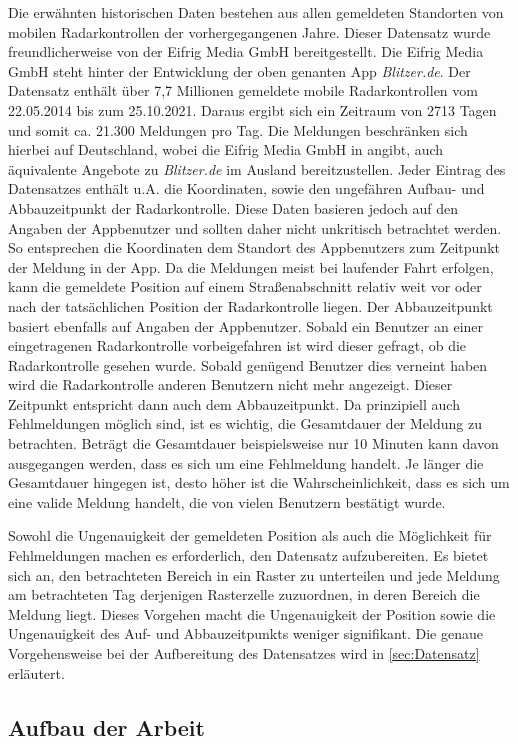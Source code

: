 Die erwähnten historischen Daten bestehen aus allen gemeldeten Standorten von mobilen Radarkontrollen der vorhergegangenen Jahre.
Dieser Datensatz wurde freundlicherweise von der Eifrig Media GmbH bereitgestellt.
Die Eifrig Media GmbH steht hinter der Entwicklung der oben genanten App \emph{Blitzer.de}.
Der Datensatz enthält über 7,7 Millionen gemeldete mobile Radarkontrollen vom 22.05.2014 bis zum 25.10.2021.
Daraus ergibt sich ein Zeitraum von 2713 Tagen und somit ca. 21.300 Meldungen pro Tag.
Die Meldungen beschränken sich hierbei auf Deutschland, wobei die Eifrig Media GmbH in \cite{AboutBlitzerDe} angibt, auch äquivalente Angebote zu \emph{Blitzer.de} im Ausland bereitzustellen.
Jeder Eintrag des Datensatzes enthält u.A. die Koordinaten, sowie den ungefähren Aufbau- und Abbauzeitpunkt der Radarkontrolle.
Diese Daten basieren jedoch auf den Angaben der Appbenutzer und sollten daher nicht unkritisch betrachtet werden.
So entsprechen die Koordinaten dem Standort des Appbenutzers zum Zeitpunkt der Meldung in der App.
Da die Meldungen meist bei laufender Fahrt erfolgen, kann die gemeldete Position auf einem Straßenabschnitt relativ weit vor oder nach der tatsächlichen Position der Radarkontrolle liegen.
Der Abbauzeitpunkt basiert ebenfalls auf Angaben der Appbenutzer.
Sobald ein Benutzer an einer eingetragenen Radarkontrolle vorbeigefahren ist wird dieser gefragt, ob die Radarkontrolle gesehen wurde.
Sobald genügend Benutzer dies verneint haben wird die Radarkontrolle anderen Benutzern nicht mehr angezeigt.
Dieser Zeitpunkt entspricht dann auch dem Abbauzeitpunkt.
Da prinzipiell auch Fehlmeldungen möglich sind, ist es wichtig, die Gesamtdauer der Meldung zu betrachten.
Beträgt die Gesamtdauer beispielsweise nur 10 Minuten kann davon ausgegangen werden, dass es sich um eine Fehlmeldung handelt.
Je länger die Gesamtdauer hingegen ist, desto höher ist die Wahrscheinlichkeit, dass es sich um eine valide Meldung handelt, die von vielen Benutzern bestätigt wurde.

Sowohl die Ungenauigkeit der gemeldeten Position als auch die Möglichkeit für Fehlmeldungen machen es erforderlich, den Datensatz aufzubereiten.
Es bietet sich an, den betrachteten Bereich in ein Raster zu unterteilen und jede Meldung am betrachteten Tag derjenigen Rasterzelle zuzuordnen, in deren Bereich die Meldung liegt.
Dieses Vorgehen macht die Ungenauigkeit der Position sowie die Ungenauigkeit des Auf- und Abbauzeitpunkts weniger signifikant.
Die genaue Vorgehensweise bei der Aufbereitung des Datensatzes wird in \autoref{sec:Datensatz} erläutert.

\subsection{Aufbau der Arbeit}
\label{sec:Aufbau}


